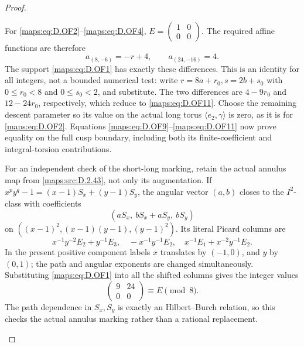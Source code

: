 \begin{proof}
\begin{enumerate}[label=\arabic*.,leftmargin=*]
For \eqref{maps:eq:D.OF2}--\eqref{maps:eq:D.OF4}, \(E=\left(\begin{smallmatrix}1&0\\0&0
\end{smallmatrix}\right)\). The required affine functions are
therefore
\[
             a_{(8,-6)}=-r+4,\qquad a_{(24,-16)}=4.
                                                               \tag{D.OF11}\label{maps:eq:D.OF11}
\]
The support \eqref{maps:eq:D.OF1} has exactly these differences.
This is an identity for all integers, not a bounded numerical
test: write \(r=8a+r_0,s=2b+s_0\) with \(0\le r_0<8\) and
\(0\le s_0<2\), and substitute. The two differences are
\(4-9r_0\) and \(12-24r_0\), respectively, which reduce to
\eqref{maps:eq:D.OF11}.
Choose the remaining descent parameter so its value on the
actual long torus \(\langle e_2,\gamma\rangle\) is zero,
as it is for \eqref{maps:eq:D.OF2}.
Equations \eqref{maps:eq:D.OF9}--\eqref{maps:eq:D.OF11} now prove equality on the full
cusp boundary, including both its finite-coefficient and
integral-torsion contributions.

For an independent check of the short-long marking, retain the
actual annulus map from \ref{maps:src:D.2.43}, not only its augmentation.
If \(x^py^q-1=(x-1)S_x+(y-1)S_y\), the angular vector \((a,b)\)
closes to the \(I^2\)-class with coefficients
\[
             (aS_x,\ bS_x+aS_y,\ bS_y)                   \tag{D.OF12}\label{maps:eq:D.OF12}
\]
on \(((x-1)^2,(x-1)(y-1),(y-1)^2)\).
Its literal Picard columns are
\[
 x^{-1}y^{-2}E_2+y^{-1}E_3,\quad
       -x^{-1}y^{-1}E_2,\quad
       x^{-1}E_1+x^{-2}y^{-1}E_2.                        \tag{D.OF13}\label{maps:eq:D.OF13}
\]
In the present positive component labels \(x\) translates by
\((-1,0)\), and \(y\) by \((0,1)\); the path and angular exponents
are changed simultaneously. Substituting \eqref{maps:eq:D.OF1} into all the
shifted columns gives the integer values
\[
                         \begin{pmatrix}9&24\\0&0\end{pmatrix}
                  \equiv E\pmod8.                       \tag{D.OF14}\label{maps:eq:D.OF14}
\]
The path dependence in \(S_x,S_y\) is exactly an
Hilbert--Burch relation, so this checks the actual annulus
marking rather than a rational replacement.


\end{enumerate}
\end{proof}
